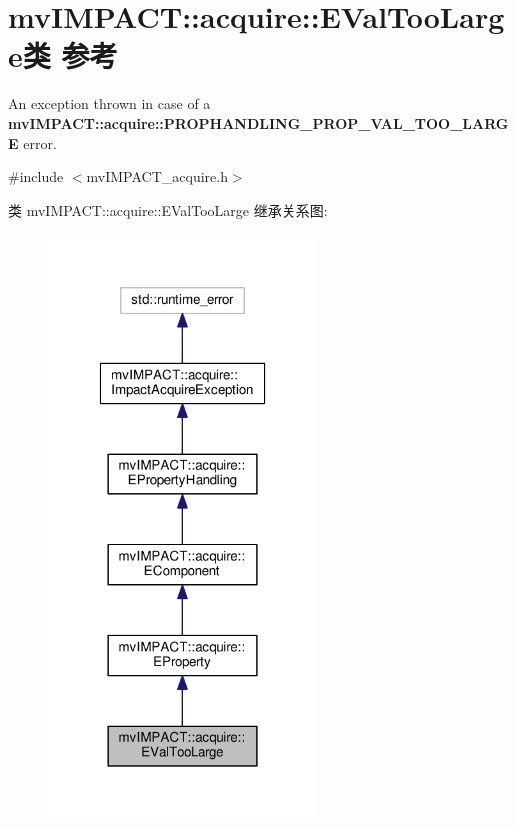 \hypertarget{classmv_i_m_p_a_c_t_1_1acquire_1_1_e_val_too_large}{\section{mv\+I\+M\+P\+A\+C\+T\+:\+:acquire\+:\+:E\+Val\+Too\+Large类 参考}
\label{classmv_i_m_p_a_c_t_1_1acquire_1_1_e_val_too_large}
}


An exception thrown in case of a {\bfseries mv\+I\+M\+P\+A\+C\+T\+::acquire\+::\+P\+R\+O\+P\+H\+A\+N\+D\+L\+I\+N\+G\+\_\+\+P\+R\+O\+P\+\_\+\+V\+A\+L\+\_\+\+T\+O\+O\+\_\+\+L\+A\+R\+G\+E} error.  




{\ttfamily \#include $<$mv\+I\+M\+P\+A\+C\+T\+\_\+acquire.\+h$>$}



类 mv\+I\+M\+P\+A\+C\+T\+:\+:acquire\+:\+:E\+Val\+Too\+Large 继承关系图\+:
\nopagebreak
\begin{figure}[H]
\begin{center}
\leavevmode
\includegraphics[width=202pt]{classmv_i_m_p_a_c_t_1_1acquire_1_1_e_val_too_large__inherit__graph}
\end{center}
\end{figure}


